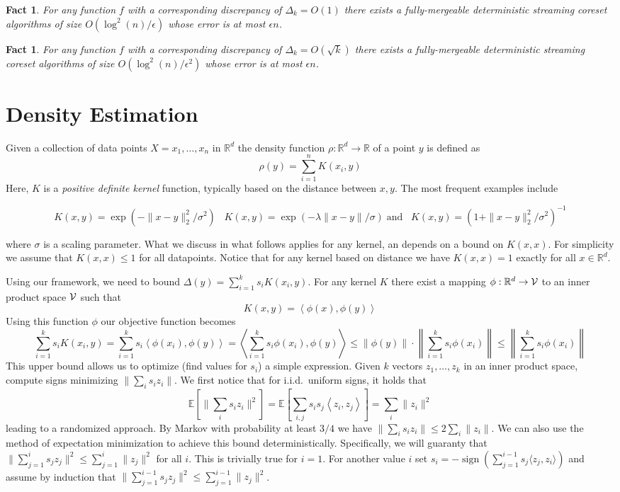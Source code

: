 \documentclass{article} %
\newtheorem{fact}[theorem]{Fact}
\newcommand{\ip}[1]{\left \langle #1 \right \rangle}
\newcommand{\R}{\mathbb{R}}
\newcommand{\E}{\mathbb{E}}
\newcommand{\eps}{\epsilon}
\begin{document}
\begin{fact}
For any function $f$ with a corresponding discrepancy of $\Delta_k = O(1)$ there exists a fully-mergeable deterministic streaming coreset algorithms of size 
$O(\log^2(n)/\eps)$ whose error is at most $\eps n$.
\end{fact}
\begin{fact}
For any function $f$ with a corresponding discrepancy of $\Delta_k = O(\sqrt{k})$ there exists a fully-mergeable deterministic streaming coreset algorithms of size 
$O(\log^2(n)/\eps^2)$ whose error is at most $\eps n$.
\end{fact}


\section{Density Estimation}

Given a collection of data points $X = x_1,\ldots, x_n$ in $\R^d$ the density function $\rho: \R^d \rightarrow \R$ of a point $y$ is defined as 
$$ \rho(y) = \sum_{i=1}^{n} K(x_i,y) $$
Here, $K$ is a \emph{positive definite kernel} function, typically based on the distance between $x,y$. The most frequent examples include

$$ K(x,y) = \exp(- \|x-y\|_2^2/\sigma^2)\;\;\; K(x,y) = \exp(-\lambda \|x-y\|/\sigma) \; \mbox{and}\;\;\; K(x,y) = (1+\|x-y\|_2^2/\sigma^2)^{-1}$$

where $\sigma$ is a scaling parameter. What we discuss in what follows applies for any kernel, an depends on a bound on $K(x,x)$. For simplicity we assume that $K(x,x) \leq 1$ for all datapoints. Notice that for any kernel based on distance we have $K(x,x)=1$ exactly for all $x \in \R^d$.


Using our framework, we need to bound $\Delta(y) = \sum_{i=1}^k s_i K(x_i,y)$. For any kernel $K$ there exist a mapping $\phi: \R^d \to {\cal V}$ to an inner product space $\cal V$ such that 
$$ K(x,y) = \ip{\phi(x), \phi(y)} $$
Using this function $\phi$ our objective function becomes
$$\sum_{i=1}^k s_i K(x_i,y) = \sum_{i=1}^k s_i \ip{\phi(x_i), \phi(y)} =  \ip{ \sum_{i=1}^k s_i \phi(x_i), \phi(y)} \leq \|\phi(y)\| \cdot \left\|  \sum_{i=1}^k s_i \phi(x_i) \right\| \leq  \left\|  \sum_{i=1}^k s_i \phi(x_i) \right\| $$
This upper bound allows us to optimize (find values for $s_i$) a simple expression.
Given $k$ vectors $z_1,\ldots,z_k$ in an inner product space, compute signs minimizing $\| \sum_i s_i z_i \|$.
We first notice that for i.i.d.\ uniform signs, it holds that
$$\E[\| \sum_i s_i z_i \|^2] = \E[\sum_{i,j} s_i s_j \ip{z_i, z_j}] = \sum_i \|z_i\|^2 $$
leading to a randomized approach. By Markov with probability at least $3/4$ we have $\| \sum_i s_i z_i \| \le 2\sum_i \|z_i\|$.
%
We can also use the method of expectation minimization to achieve this bound deterministically.
Specifically, we will guaranty that $\| \sum_{j=1}^i s_j z_j \|^2 \le \sum_{j=1}^i \|z_j\|^2$ for all $i$.
This is trivially true for $i=1$. 
For another value $i$ set $s_i = -\operatorname{sign} (\sum_{j=1}^{i-1}s_j \langle z_j, z_i \rangle)$ 
and  assume by induction that $\| \sum_{j=1}^{i-1} s_j z_j\|^2 \le \sum_{j=1}^{i-1} \|z_j\|^2$.
\end{document}
